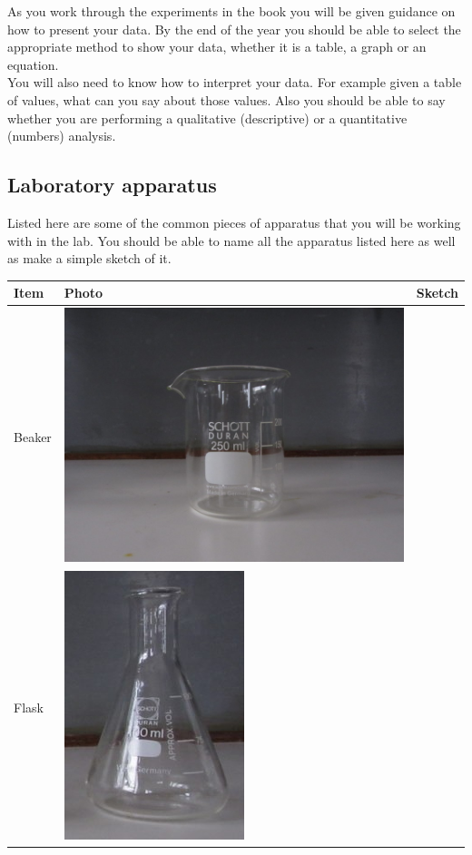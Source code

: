 \begin{enumerate}[label=\textbf{\arabic*}.]
As you work through the experiments in the book you will be given guidance on how to present your data. By the end of the year you should be able to select the appropriate method to show your data, whether it is a table, a graph or an equation.\\
You will also need to know how to interpret your data. For example given a table of values, what can you say about those values. Also you should be able to say whether you are performing a qualitative (descriptive) or a quantitative (numbers) analysis. 
\subsection*{Laboratory apparatus}
Listed here are some of the common pieces of apparatus that you will be working with in the lab. You should be able to name all the apparatus listed here as well as make a simple sketch of it. 
\begin{table}[H]
 \begin{center}
  \begin{tabular}{|l|p{3cm}|p{3cm}|}\hline
   \textbf{Item} & \textbf{Photo} & \textbf{Sketch} \\ \hline
Beaker & \includegraphics[width=.2\textwidth]{photos/beaker.jpg} & \scalebox{.4}{\begin{pspicture}(0,0)(5,5) \pstTubeEssais[glassType=becher] \end{pspicture}} \\ \hline
Flask & \includegraphics[width=.05\textheight]{photos/flask.JPG} & \scalebox{.4}{\begin{pspicture}(0,0)(5,5) \pstTubeEssais[glassType=erlen] \end{pspicture}} \\ \hline

\end{tabular}
\end{center}
\end{table}
\end{enumerate}
